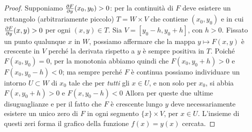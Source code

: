 \begin{proof}
	Supponiamo $\frac{\partial {F}}{\partial {y}}(x_0,y_0)>0$: per la continuità di $F$ deve esistere un rettangolo (arbitrariamente piccolo) $T=W\times V$ che contiene $(x_0,y_0)$ e in cui $\frac{\partial {F}}{\partial {y}}(x,y)>0$ per ogni $(x,y)\in T$.
	Sia $V=[y_0-h,y_0+h]$, con $h>0$. Fissato un punto qualunque $x$ in $W$, possiamo affermare che la mappa $y\mapsto F(x,y)$ è crescente in $V$ perché la derivata rispetto a $y$ è sempre positiva in $T$.
	Poich\'e $F(x_0,y_0)=0$, per la monotonia abbiamo quindi che $F(x_0,y_0+h)>0$ e $F(x_0,y_0-h)<0$; ma sempre perché $F$ è continua possiamo individuare un intorno $U\subset W$ di $x_0$ tale che per \emph{tutti} gli $x\in U$, e non solo per $x_0$, si abbia $F(x,y_0+h)>0$ e $F(x,y_0-h)<0$
	Allora per queste due ultime disuguaglianze e per il fatto che $F$ è crescente lungo $y$ deve necessariamente esistere un unico zero di $F$ in ogni segmento $\{x\}\times V$, per $x\in U$.
	L'insieme di questi zeri forma il grafico della funzione $f(x)=y(x)$ cercata.


\end{proof}
